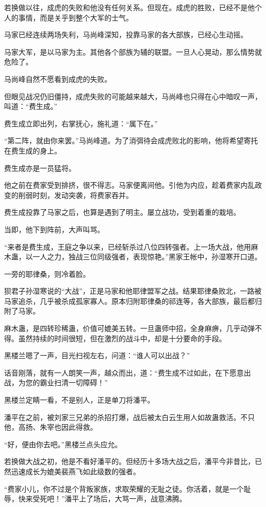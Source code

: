 \begin{this_body}
若换做以往，成虎的失败和他没有任何关系。但现在。成虎的胜败，已经不是他个人的事情，而是关乎到整个大军的士气。

马家已经连续两场失利，马尚峰深知，投靠马家的各大部族，已经心生动摇。

马家大军，是以马家为主。其他各个部族为辅的联盟。一旦人心晃动，那么情势就危险了。

马尚峰自然不愿看到成虎的失败。

但眼见战况仍旧僵持，成虎失败的可能越来越大，马尚峰也只得在心中暗叹一声，叫道：“费生成。”

费生成立即出列，右掌抚心，施礼道：“属下在。”

“第二阵，就由你来罢。”马尚峰道。为了消弭待会成虎败北的影响，他将希望寄托在费生成的身上。

费生成亦是一员猛将。

他之前在费家受到排挤，很不得志。马家便离间他。引他为内应，趁着费家内乱政变的削弱时刻，发动突袭，将费家吞并。

费生成投靠了马家之后，也算是遇到了明主。屡立战功，受到着重的栽培。

当即，他下到阵前，大声叫骂。

“来者是费生成，王庭之争以来，已经斩杀过八位四转强者。上一场大战，他用麻木蛊，以一人之力，独战三位同级强者，表现惊艳。”黑家王帐中，孙湿寒开口道。

一旁的耶律桑，则冷着脸。

狈君子孙湿寒说的“大战”，正是马家和他耶律盟军之战。结果耶律桑败北，一路被马家追杀，几乎被杀成孤家寡人。原本归附耶律桑的祁连等，各大部族，最后都归附了马家。

麻木蛊，是四转珍稀蛊，价值可媲美五转。一旦蛊师中招，全身麻痹，几乎动弹不得。虽然持续的时间很短，但在激烈的战斗中，却是十分要命的手段。

黑楼兰嗯了一声，目光扫视左右，问道：“谁人可以出战？”

话音刚落，就有一人朗笑一声，越众而出，道：“费生成不过如此，在下愿意出战，为您的霸业扫清一切障碍！”

黑楼兰定睛一看，不是别人，正是单刀将潘平。

潘平在之前，被刘家三兄弟的杀招打爆，战后被太白云生用人如故蛊救活。不只他，高扬、朱宰也因此得救。

“好，便由你去吧。”黑楼兰点头应允。

若换做大战之初，他是不看好潘平的。但经历十多场大战之后，潘平今非昔比，已然迅速成长为媲美裴燕飞如此级数的强者。

“费家小儿，你不过是个背叛家族，求取荣耀的无耻之徒。你活着，就是一个耻辱，快来受死吧！”潘平上了场后，大骂一声，战意沸腾。


\end{this_body}

